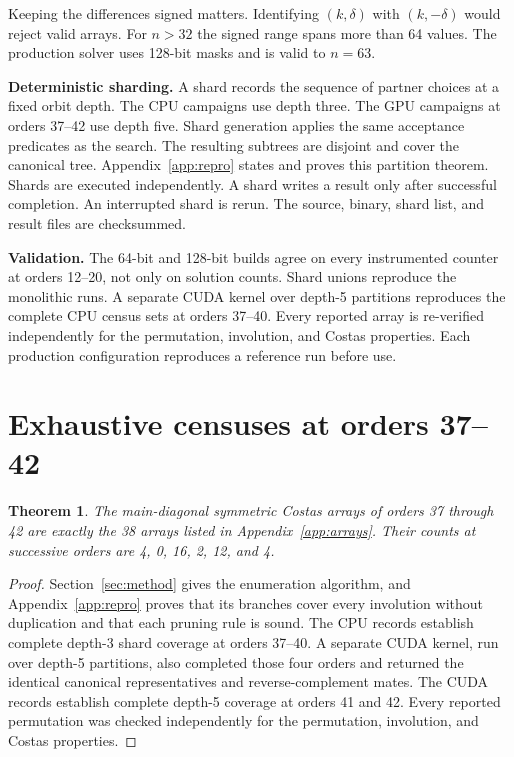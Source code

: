 \documentclass[11pt]{article}
\newtheorem{theorem}{Theorem}
\begin{document}
Keeping the differences signed matters.  Identifying $(k,\delta)$ with
$(k,-\delta)$ would reject valid arrays.  For $n>32$ the signed range
spans more than 64 values.  The production solver uses 128-bit masks and
is valid to $n=63$.

\textbf{Deterministic sharding.}  A shard records the sequence of partner
choices at a fixed orbit depth.  The CPU campaigns use depth three.  The GPU
campaigns at orders 37--42 use depth five.  Shard generation applies the same
acceptance predicates as the search.  The resulting subtrees are disjoint and
cover the canonical tree.  Appendix~\ref{app:repro} states and proves this
partition theorem.  Shards are executed independently.  A shard writes a
result only after successful completion.  An interrupted shard is rerun.
The source, binary, shard list, and result files are checksummed.

\textbf{Validation.}  The 64-bit and 128-bit builds agree on every
instrumented counter at orders 12--20, not only on solution counts.  Shard
unions reproduce the monolithic runs.  A separate CUDA kernel over depth-5
partitions reproduces the complete CPU census sets at orders 37--40.  Every
reported array is re-verified independently for the permutation, involution,
and Costas properties.  Each production configuration reproduces a reference
run before use.

\section{Exhaustive censuses at orders 37--42}
\label{sec:census}

\begin{theorem}
\label{thm:census}
The main-diagonal symmetric Costas arrays of orders 37 through 42 are
exactly the 38 arrays listed in Appendix~\ref{app:arrays}.  Their counts
at successive orders are 4, 0, 16, 2, 12, and 4.
\end{theorem}

\begin{proof}
Section~\ref{sec:method} gives the enumeration algorithm, and
Appendix~\ref{app:repro} proves that its branches cover every involution
without duplication and that each pruning rule is sound.  The CPU records
establish complete depth-3 shard coverage at orders 37--40.  A separate
CUDA kernel, run over depth-5 partitions, also completed those four orders
and returned the identical canonical representatives and
reverse-complement mates.  The CUDA records establish complete depth-5
coverage at orders 41 and 42.  Every reported permutation was checked
independently for the permutation, involution, and Costas properties.
\end{proof}
\end{document}
